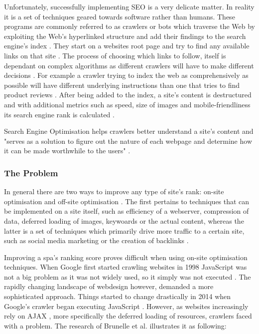 Unfortunately, successfully implementing SEO is a very delicate matter. In reality it is a set of techniques geared towards software rather than humans. These programs are commonly referred to as crawlers or bots which traverse the Web by exploiting the Web's hyperlinked structure and add their findings to the search engine's index \cite{Fink2014:inbook,menczer2001evaluating:proceedings}. They start on a websites root page and try to find any available links on that site \cite{Fink2014:inbook}. The process of choosing which links to follow, itself is dependant on complex algorithms as different crawlers will have to make different decisions \cite{menczer2001evaluating:proceedings}. For example a crawler trying to index the web as comprehensively as possible will have different underlying instructions than one that tries to find product reviews \cite{menczer2001evaluating:proceedings}. After being added to the index, a site's content is destructured and with additional metrics such as speed, size of images and mobile-friendliness its search engine rank is calculated \cite{Fink2014:inbook}.

Search Engine Optimisation helps crawlers better understand a site's content and "serves as a solution to figure out the nature of each webpage and determine how it can be made worthwhile to the users" \cite{Khan2018:article}.

\subsubsection{The Problem}
In general there are two ways to improve any type of site's rank: on-site optimisation and off-site optimisation \cite{Khan2018:article}. The first pertains to techniques that can be implemented on a site itself, such as efficiency of a webserver, compression of data, deferred loading of images, keywoards or the actual content, whereas the latter is a set of techniques which primarily drive more traffic to a certain site, such as social media marketing or the creation of backlinks \cite{Khan2018:article}. 

Improving a \acrlong{spa}'s ranking score proves difficult when using on-site optimisation techniques. When Google first started crawling websites in 1998 JavaScript was not a big problem as it was not widely used, so it simply was not executed \cite{GoogleUsesJavascript:online}. The rapidly changing landscape of webdesign however, demanded a more sophisticated approach. Things started to change drastically in 2014 when Google's crawler began executing JavaScript \cite{GoogleUsesJavascript:online}. However, as websites increasingly rely on AJAX \cite[p.~97]{Brunelle2016:article}, more specifically the deferred loading of resources, crawlers faced with a problem. The research of Brunelle et al. \cite[p.~97]{Brunelle2016:article} illustrates it as following:

